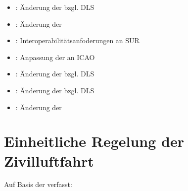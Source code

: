\begin{itemize}
        \item {}:   Änderung der  bzgl. \acs{DLS} %
        \item {}:  Änderung der  %
        \item {}:   Interoperabilitätsanfoderungen an \acs{SUR} %
        \item {}:   Anpassung der  an {ICAO} %
        \item {}:  Änderung der  bzgl. \acs{DLS}%
        \item {}:   Änderung der  bzgl. \acs{DLS}%
        \item {}:   Änderung der  %
    \end{itemize}

\pagebreak   
\section{Einheitliche Regelung der Zivilluftfahrt} 
    Auf Basis der  verfasst:

